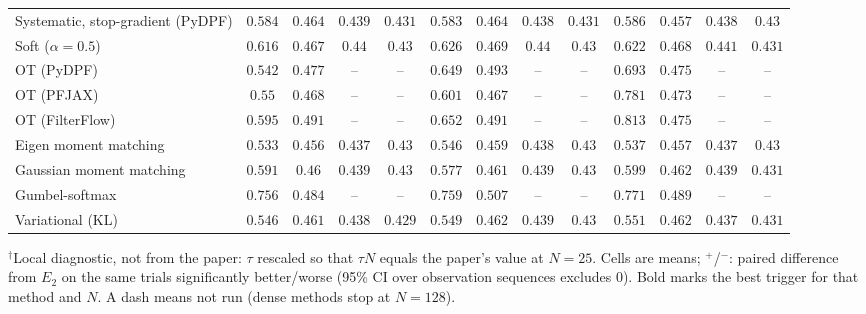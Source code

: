 \begin{table}[ht]
\begin{adjustbox}{max width=\linewidth}
\begin{tabular}{lcccc|cccc|cccc}
Systematic, stop-gradient (PyDPF) & $0.584$ & $0.464$ & $0.439$ & $0.431$ & $\mathbf{0.583}$ & $0.464$ & $\mathbf{0.438}$ & $0.431$ & $0.586$ & $\mathbf{0.457}$ & $0.438$ & $\mathbf{0.43}$ \\
Soft ($\alpha{=}0.5$) & $\mathbf{0.616}$ & $\mathbf{0.467}$ & $\mathbf{0.44}$ & $\mathbf{0.43}$ & $0.626$ & $0.469$ & $0.44$ & $0.43$ & $0.622$ & $0.468$ & $0.441$ & $0.431$ \\
OT (PyDPF) & $\mathbf{0.542}$ & $0.477$ & -- & -- & $0.649$ & $0.493$ & -- & -- & $0.693$ & $\mathbf{0.475}$ & -- & -- \\
OT (PFJAX) & $\mathbf{0.55}$ & $0.468$ & -- & -- & $0.601$ & $\mathbf{0.467}$ & -- & -- & $0.781$ & $0.473$ & -- & -- \\
OT (FilterFlow) & $\mathbf{0.595}$ & $0.491$ & -- & -- & $0.652$ & $0.491$ & -- & -- & $0.813$ & $\mathbf{0.475}$ & -- & -- \\
Eigen moment matching & $\mathbf{0.533}$ & $\mathbf{0.456}$ & $0.437$ & $0.43$ & $0.546$ & $0.459$ & $0.438$ & $\mathbf{0.43}$ & $0.537$ & $0.457$ & $\mathbf{0.437}$ & $0.43$ \\
Gaussian moment matching & $0.591$ & $\mathbf{0.46}$ & $0.439$ & $0.43$ & $\mathbf{0.577}$ & $0.461$ & $0.439$ & $\mathbf{0.43}$ & $0.599$ & $0.462$ & $\mathbf{0.439}$ & $0.431$ \\
Gumbel-softmax & $\mathbf{0.756}$ & $\mathbf{0.484}$ & -- & -- & $0.759$ & $0.507$ & -- & -- & $0.771$ & $0.489$ & -- & -- \\
Variational (KL) & $\mathbf{0.546}$ & $\mathbf{0.461}$ & $0.438$ & $\mathbf{0.429}$ & $0.549$ & $0.462$ & $0.439$ & $0.43$ & $0.551$ & $0.462$ & $\mathbf{0.437}$ & $0.431$ \\
\bottomrule
\end{tabular}
\end{adjustbox}
\par\smallskip\parbox{0.95\linewidth}{\footnotesize $^\dagger$Local diagnostic, not from the paper: $\tau$ rescaled so that $\tau N$ equals the paper's value at $N{=}25$. Cells are means; $^{+}$/$^{-}$: paired difference from $E_2$ on the same trials significantly better/worse (95\% CI over observation sequences excludes 0). Bold marks the best trigger for that method and $N$. A dash means not run (dense methods stop at $N{=}128$).}
\end{table}

